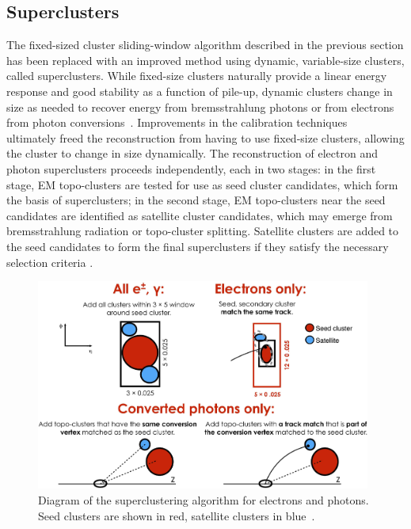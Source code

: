 \subsection{Superclusters}\label{sec:egamma:supercluster}
The fixed-sized cluster sliding-window algorithm described in the previous section has been replaced with an improved method using dynamic, variable-size clusters, called superclusters.
While fixed-size clusters naturally provide a linear energy response and good stability as a function of pile-up, dynamic clusters change in size as needed to recover energy from bremsstrahlung photons or from electrons from photon conversions~\cite{EGAM-2018-01}.
Improvements in the calibration techniques~\cite{PERF-2017-03} ultimately freed the reconstruction from having to use fixed-size clusters, allowing the cluster to change in size dynamically.
The reconstruction of electron and photon superclusters proceeds independently, each in two stages: in the first stage, EM topo-clusters are tested for use as seed cluster candidates, which form the basis of superclusters; in the second stage, EM topo-clusters near the seed candidates are identified as satellite cluster candidates, which may emerge from bremsstrahlung radiation or topo-cluster splitting.
Satellite clusters are added to the seed candidates to form the final superclusters if they satisfy the necessary selection criteria \cite{EGAM-2018-01}.
\begin{figure}[tbp]
  \begin{center}
    \includegraphics[width=0.98\textwidth]{figs/egamma/superclusters.png}
  \end{center}
  \caption[Diagram of the superclustering algorithm for electrons and photons. Seed clusters are shown in red, satellite clusters in blue.]
          {Diagram of the superclustering algorithm for electrons and photons. Seed clusters are shown in red, satellite clusters in blue~\cite{EGAM-2018-01}.}
  \label{fig:egamma:supercluster}
\end{figure}
